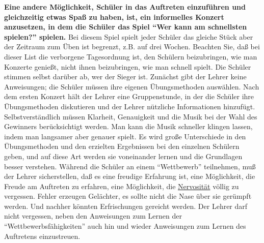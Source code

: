 \textbf{Eine andere Möglichkeit, Schüler in das Auftreten einzuführen und gleichzeitig etwas Spaß zu haben, ist, ein informelles Konzert anzusetzen, in dem die Schüler das Spiel \enquote{Wer kann am schnellsten spielen?} spielen.}
Bei diesem Spiel spielt jeder Schüler das gleiche Stück aber der Zeitraum zum Üben ist begrenzt, z.B. auf drei Wochen.
Beachten Sie, daß bei dieser List die verborgene Tagesordnung ist, den Schülern beizubringen, wie man Konzerte genießt, nicht ihnen beizubringen, wie man schnell spielt.
Die Schüler stimmen selbst darüber ab, wer der Sieger ist.
Zunächst gibt der Lehrer keine Anweisungen; die Schüler müssen ihre eigenen Übungsmethoden auswählen.
Nach dem ersten Konzert hält der Lehrer eine Gruppenstunde, in der die Schüler ihre Übungsmethoden diskutieren und der Lehrer nützliche Informationen hinzufügt.
Selbstverständlich müssen Klarheit, Genauigkeit und die Musik bei der Wahl des Gewinners berücksichtigt werden.
Man kann die Musik schneller klingen lassen, indem man langsamer aber genauer spielt.
Es wird große Unterschiede in den Übungsmethoden und den erzielten Ergebnissen bei den einzelnen Schülern geben, und auf diese Art werden sie voneinander lernen und die Grundlagen besser verstehen.
Während die Schüler an einem \enquote{Wettbewerb} teilnehmen, muß der Lehrer sicherstellen, daß es eine freudige Erfahrung ist, eine Möglichkeit, die Freude am Auftreten zu erfahren, eine Möglichkeit, die \hyperlink{c1iii15}{Nervosität} völlig zu vergessen.
Fehler erzeugen Gelächter, es sollte nicht die Nase über sie gerümpft werden.
Und nachher könnten Erfrischungen gereicht werden.
Der Lehrer darf nicht vergessen, neben den Anweisungen zum Lernen der \enquote{Wettbewerbsfähigkeiten} auch hin und wieder Anweisungen zum Lernen des Auftretens einzustreuen.


